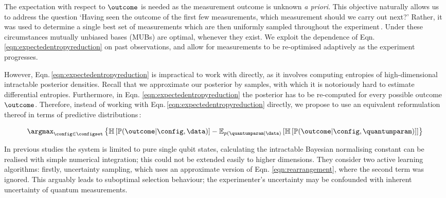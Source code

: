 The expectation with respect to $\outcome$ is needed as the measurement outcome is unknown \emph{a priori}. This objective naturally allows us to address the question `Having seen the outcome of the first few measurements, which measurement should we carry out next?'
Rather, it was used to determine a single best set of measurements which are then uniformly sampled throughout the experiment\,\citep{MUBFirst,ExactInformation}. Under these circumstances mutually unbiased bases (MUBs) are optimal, whenever they exist. We exploit the dependence of Eqn.\,\eqref{eqn:expectedentropyreduction} on past observations, and allow for measurements to be re-optimised adaptively as the experiment progresses.

However, Eqn.\,\eqref{eqn:expectedentropyreduction}  is impractical to work with directly, as it involves computing entropies of high-dimensional intractable posterior densities. Recall that we approximate our posterior by samples, with which it is notoriously hard to estimate differential entropies. Furthermore, in Eqn. \eqref{eqn:expectedentropyreduction} the posterior has to be re-computed for every possible outcome $\outcome$. Therefore, instead of working with Eqn.\,\eqref{eqn:expectedentropyreduction} directly, we propose to use an equivalent reformulation thereof in terms of predictive distributions\,\citep{ExactInformation}:

\begin{equation}
\argmax_{\config\in\configset} \left\{ \mathbb{H}\left[\mathbb{P}(\outcome|\config,\data)\right] - \mathbb{E}_{p(\quantumparam\vert\data)}\left[\mathbb{H}\left[ \mathbb{P}(\outcome|\config,\quantumparam) \right] \right]\right\}\label{eqn:rearrangement}
\end{equation}

In previous studies \citep{SelfLearning} the system is limited to pure single qubit states, calculating the intractable Bayesian normalising constant can be realised with simple numerical integration; this could not be extended easily to higher dimensions. They consider two active learning algorithms: firstly, uncertainty sampling, which uses an approximate version of Eqn. \eqref{eqn:rearrangement}, where the second term was ignored. This arguably leads to suboptimal selection behaviour; the experimenter's uncertainty may be confounded with inherent uncertainty of quantum measurements. 

